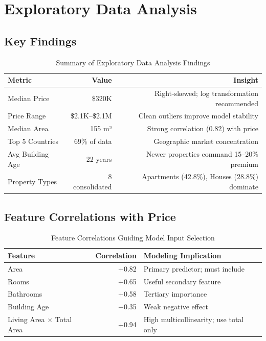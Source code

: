\documentclass[12pt,a4paper]{article}
\begin{document}
\section{Exploratory Data Analysis}

\subsection{Key Findings}

\begin{table}[H]
\centering\small
\begin{tabular}{lrr}
\toprule
\textbf{Metric} & \textbf{Value} & \textbf{Insight} \\
\midrule
Median Price & \$320K & Right-skewed; log transformation recommended \\
Price Range & \$2.1K--\$2.1M & Clean outliers improve model stability \\
Median Area & 155 m² & Strong correlation (0.82) with price \\
Top 5 Countries & 69\% of data & Geographic market concentration \\
Avg Building Age & 22 years & Newer properties command 15--20\% premium \\
Property Types & 8 consolidated & Apartments (42.8\%), Houses (28.8\%) dominate \\
\bottomrule
\end{tabular}
\caption{Summary of Exploratory Data Analysis Findings}
\label{tbl:eda_summary}
\end{table}

\subsection{Feature Correlations with Price}

\begin{table}[H]
\centering\small
\begin{tabular}{lrl}
\toprule
\textbf{Feature} & \textbf{Correlation} & \textbf{Modeling Implication} \\
\midrule
Area & +0.82 & Primary predictor; must include \\
Rooms & +0.65 & Useful secondary feature \\
Bathrooms & +0.58 & Tertiary importance \\
Building Age & $-$0.35 & Weak negative effect \\
Living Area $\times$ Total Area & +0.94 & High multicollinearity; use total only \\
\bottomrule
\end{tabular}
\caption{Feature Correlations Guiding Model Input Selection}
\end{table}
\end{document}
